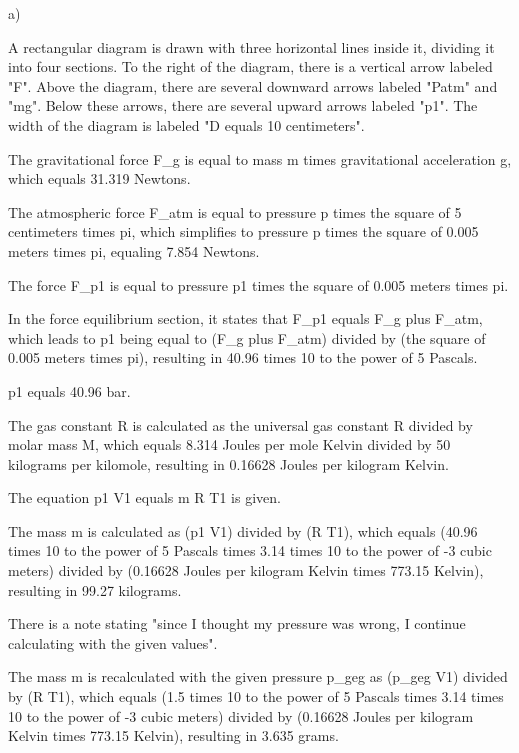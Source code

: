 a) 

A rectangular diagram is drawn with three horizontal lines inside it, dividing it into four sections. To the right of the diagram, there is a vertical arrow labeled "F". Above the diagram, there are several downward arrows labeled "Patm" and "mg". Below these arrows, there are several upward arrows labeled "p1". The width of the diagram is labeled "D equals 10 centimeters".

The gravitational force F_g is equal to mass m times gravitational acceleration g, which equals 31.319 Newtons.

The atmospheric force F_atm is equal to pressure p times the square of 5 centimeters times pi, which simplifies to pressure p times the square of 0.005 meters times pi, equaling 7.854 Newtons.

The force F_p1 is equal to pressure p1 times the square of 0.005 meters times pi.

In the force equilibrium section, it states that F_p1 equals F_g plus F_atm, which leads to p1 being equal to (F_g plus F_atm) divided by (the square of 0.005 meters times pi), resulting in 40.96 times 10 to the power of 5 Pascals.

p1 equals 40.96 bar.

The gas constant R is calculated as the universal gas constant R divided by molar mass M, which equals 8.314 Joules per mole Kelvin divided by 50 kilograms per kilomole, resulting in 0.16628 Joules per kilogram Kelvin.

The equation p1 V1 equals m R T1 is given.

The mass m is calculated as (p1 V1) divided by (R T1), which equals (40.96 times 10 to the power of 5 Pascals times 3.14 times 10 to the power of -3 cubic meters) divided by (0.16628 Joules per kilogram Kelvin times 773.15 Kelvin), resulting in 99.27 kilograms.

There is a note stating "since I thought my pressure was wrong, I continue calculating with the given values".

The mass m is recalculated with the given pressure p_geg as (p_geg V1) divided by (R T1), which equals (1.5 times 10 to the power of 5 Pascals times 3.14 times 10 to the power of -3 cubic meters) divided by (0.16628 Joules per kilogram Kelvin times 773.15 Kelvin), resulting in 3.635 grams.